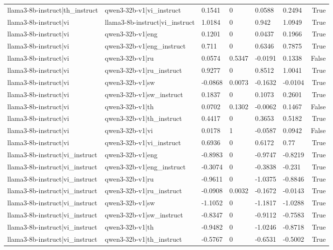 \begin{table}
\begin{tabular}{llllllr}
llama3-8b-instruct|th_instruct & qwen3-32b-v1|vi_instruct & 0.1541 & 0 & 0.0588 & 0.2494 & True \\
llama3-8b-instruct|vi & llama3-8b-instruct|vi_instruct & 1.0184 & 0 & 0.942 & 1.0949 & True \\
llama3-8b-instruct|vi & qwen3-32b-v1|eng & 0.1201 & 0 & 0.0437 & 0.1966 & True \\
llama3-8b-instruct|vi & qwen3-32b-v1|eng_instruct & 0.711 & 0 & 0.6346 & 0.7875 & True \\
llama3-8b-instruct|vi & qwen3-32b-v1|ru & 0.0574 & 0.5347 & -0.0191 & 0.1338 & False \\
llama3-8b-instruct|vi & qwen3-32b-v1|ru_instruct & 0.9277 & 0 & 0.8512 & 1.0041 & True \\
llama3-8b-instruct|vi & qwen3-32b-v1|sw & -0.0868 & 0.0073 & -0.1632 & -0.0104 & True \\
llama3-8b-instruct|vi & qwen3-32b-v1|sw_instruct & 0.1837 & 0 & 0.1073 & 0.2601 & True \\
llama3-8b-instruct|vi & qwen3-32b-v1|th & 0.0702 & 0.1302 & -0.0062 & 0.1467 & False \\
llama3-8b-instruct|vi & qwen3-32b-v1|th_instruct & 0.4417 & 0 & 0.3653 & 0.5182 & True \\
llama3-8b-instruct|vi & qwen3-32b-v1|vi & 0.0178 & 1 & -0.0587 & 0.0942 & False \\
llama3-8b-instruct|vi & qwen3-32b-v1|vi_instruct & 0.6936 & 0 & 0.6172 & 0.77 & True \\
llama3-8b-instruct|vi_instruct & qwen3-32b-v1|eng & -0.8983 & 0 & -0.9747 & -0.8219 & True \\
llama3-8b-instruct|vi_instruct & qwen3-32b-v1|eng_instruct & -0.3074 & 0 & -0.3838 & -0.231 & True \\
llama3-8b-instruct|vi_instruct & qwen3-32b-v1|ru & -0.9611 & 0 & -1.0375 & -0.8846 & True \\
llama3-8b-instruct|vi_instruct & qwen3-32b-v1|ru_instruct & -0.0908 & 0.0032 & -0.1672 & -0.0143 & True \\
llama3-8b-instruct|vi_instruct & qwen3-32b-v1|sw & -1.1052 & 0 & -1.1817 & -1.0288 & True \\
llama3-8b-instruct|vi_instruct & qwen3-32b-v1|sw_instruct & -0.8347 & 0 & -0.9112 & -0.7583 & True \\
llama3-8b-instruct|vi_instruct & qwen3-32b-v1|th & -0.9482 & 0 & -1.0246 & -0.8718 & True \\
llama3-8b-instruct|vi_instruct & qwen3-32b-v1|th_instruct & -0.5767 & 0 & -0.6531 & -0.5002 & True \\

\end{tabular}
\end{table}
